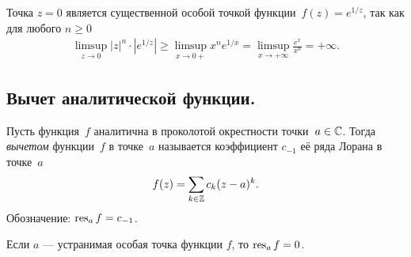 \documentclass[../complex-analysis.tex]{subfiles}
\begin{document}
\begin{exmpl}
 Точка $ z=0 $ является существенной особой точкой функции~$ f(z)= e^{1 / z} $, так как для любого $ n \geqslant 0 $
 \begin{align*}
  \limsup_{z \to 0} \left| z \right|^{n} \cdot \left| e^{1 / z} \right| \geqslant \limsup_{x \to 0+} x^{n} e^{1 / x} = \limsup_{x \to +\infty} \frac{e^{x}}{x^{n}} = +\infty.
 \end{align*}
\end{exmpl}

\subsection{Вычет аналитической функции.}

\begin{df}
 Пусть функция~$ f $ аналитична в проколотой окрестности точки~$ a \in \mathbb{C} $. Тогда \emph{вычетом} функции~$ f $ в точке~$ a $ называется коэффициент $ c_{-1} $ её ряда Лорана в точке~$ a $
 \begin{align*}
  f(z) = \sum_{k \in \mathbb{Z}} c_k (z-a)^{k}.
 \end{align*} Обозначение: $ \operatorname{res}_a f = c_{-1} $.
\end{df}

\begin{exmpl}
 Если $ a $ --- устранимая особая точка функции $ f $, то $ \operatorname{res}_a f = 0 $.
\end{exmpl}
\end{document}

